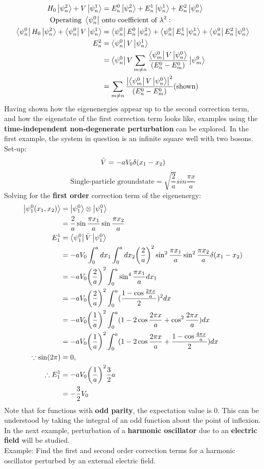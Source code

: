 \documentclass{article}
\begin{document}
\begin{flushleft}
\begin{align*}
    H_0\ket{\psi_n^2}+V\ket{\psi_n^1}&=E_n^0\ket{\psi_n^2}+E_n^1\ket{\psi_n^1}+E_n^2\ket{\psi_n^0}\\
    \text{Operating}\ \bra{\psi_n^0}\ &\text{onto coefficient of}\ \lambda^2:\\
    \bra{\psi_n^0}H_0\ket{\psi_n^2}+\bra{\psi_n^0}V\ket{\psi_n^1}&=\bra{\psi_n^0}E_n^0\ket{\psi_n^2}+\bra{\psi_n^0}E_n^1\ket{\psi_n^1}+\bra{\psi_n^0}E_n^2\ket{\psi_n^0}\\
    E_n^2&=\bra{\psi_n^0}V\ket{\psi_n^1}\\
    &=\bra{\psi_n^0}V\sum_{m\neq n}\frac{\bra{\psi_m^0}V\ket{\psi_n^0}}{(E_n^0-E_m^0)}\ket{\psi_m^0}\\
    &=\sum_{m\neq n}\frac{\abs{\bra{\psi_m^0}V\ket{\psi_n^0}}^2}{(E_n^0-E_m^0)}\text{(shown)}
\end{align*}
Having shown how the eigenenergies appear up to the second correction term, and how the eigenstate of the first correction term looks like, examples using the \textbf{time-independent non-degenerate perturbation} can be explored. In the first example, the system in question is an infinite square well with two bosons.\\
Set-up:
$$\Bar{V}=-aV_0\delta(x_1-x_2)$$
$$\text{Single-particle groundstate}=\sqrt{\frac{2}{a}}sin\frac{\pi x}{a}$$
Solving for the \textbf{first order} correction term of the eigenenergy:
\begin{align*}
    \ket{\psi_1^0(x_1,x_2)}&=\ket{\psi_1^0}\otimes\ket{\psi_1^0}\\
    &=\frac{2}{a}\sin\frac{\pi x_1}{a}\sin\frac{\pi x_2}{a}\\
    E_1^1&=\bra{\psi_1^0}\bar{V}\ket{\psi_1^0}\\
    &=-aV_0\int_0^a dx_1\int_0^a dx_2 \bigg(\frac{2}{a}\bigg)^2\sin^2\frac{\pi x_1}{a}\sin^2\frac{\pi x_2}{a}\delta(x_1-x_2)\\
    &=-aV_0\bigg(\frac{2}{a}\bigg)^2\int_0^a \sin^4\frac{\pi x_1}{a} dx_1\\
    &=-aV_0\bigg(\frac{2}{a}\bigg)^2\int_0^a (\frac{1-\cos\frac{2\pi x}{a}}{2})^2 dx\\
    &=-aV_0\bigg(\frac{1}{a}\bigg)^2\int_0^a (1-2\cos\frac{2\pi x}{a}+\cos^2\frac{2\pi x}{a}) dx\\
    &=-aV_0\bigg(\frac{1}{a}\bigg)^2\int_0^a (1-2\cos\frac{2\pi x}{a}+\frac{1-\cos\frac{4\pi x}{a}}{2}) dx\\
    \because \sin(2\pi)&=0,\\
    \therefore E_1^1&=-aV_0\bigg(\frac{1}{a}\bigg)^2\frac{3}{2}a\\
    &=-\frac{3}{2}V_0
\end{align*}
Note that for functions with \textbf{odd parity}, the expectation value is 0. This can be understood by taking the integral of an odd function about the point of inflexion. In the next example, perturbation of a \textbf{harmonic oscillator} due to an \textbf{electric field} will be studied.\\
Example: Find the first and second order correction terms for a harmonic oscillator perturbed by an external electric field.


\end{flushleft}
\end{document}
